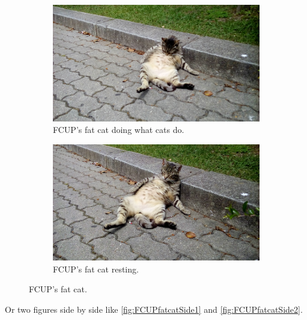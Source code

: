 \begin{figure}
	\centering
	\begin{subfigure}{.49\textwidth}
  		\centering
  		\includegraphics[width=.95\linewidth]{Figures/ChapterTemplate/20160517_123603.jpg}
  		\caption{FCUP's fat cat doing what cats do.}
	\end{subfigure}%
	\hfill
	\begin{subfigure}{.49\textwidth}
  		\centering
 		 \includegraphics[width=.95\linewidth]{Figures/ChapterTemplate/20160517_123609.jpg}
 		 \caption{FCUP's fat cat resting.}
	\end{subfigure}
	\caption{\label{fig:FCUPfatCat}FCUP's fat cat.} 
\end{figure}


Or two figures side by side like \ref{fig:FCUPfatcatSide1} and \ref{fig:FCUPfatcatSide2}.

